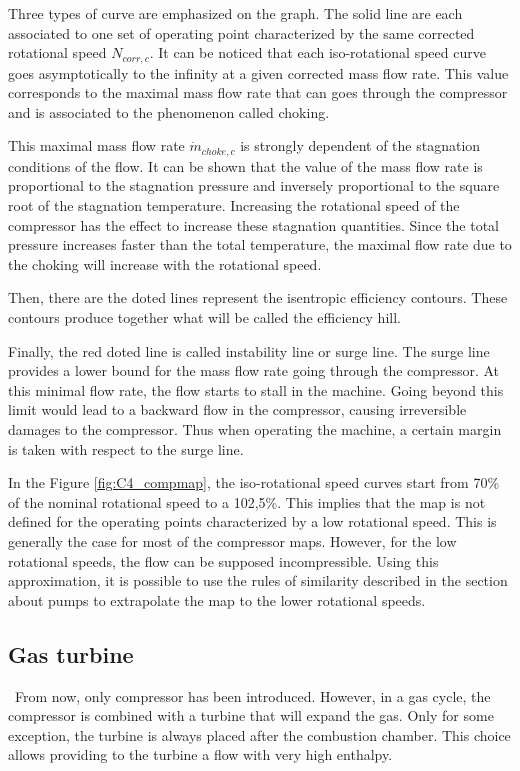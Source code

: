 Three types of curve are emphasized on the graph. The solid line are each associated to one set of operating point characterized by the same corrected rotational speed $N_{corr,c}$. It can be noticed that each iso-rotational speed curve goes asymptotically to the infinity at a given corrected mass flow rate. This value corresponds to the maximal mass flow rate that can goes through the compressor and is associated to the phenomenon called choking. 

This maximal mass flow rate $\dot{m}_{choke,c}$ is strongly dependent of the stagnation conditions of the flow. It can be shown that the value of the mass flow rate is proportional to the stagnation pressure and inversely proportional to the square root of the stagnation temperature.
Increasing the rotational speed of the compressor has the effect to increase these stagnation quantities. Since the total pressure increases faster than the total temperature, the maximal flow rate due to the choking will increase with the rotational speed.

Then, there are the doted lines represent the isentropic efficiency contours. These contours produce together what will be called the efficiency hill.

Finally, the red doted line is called instability line or surge line. The surge line provides a lower bound for the mass flow rate going through the compressor. At this minimal flow rate, the flow starts to stall in the machine. Going beyond this limit would lead to a backward flow in the compressor, causing irreversible damages to the compressor. Thus when operating the machine, a certain margin is taken with respect to the surge line.

In the Figure \ref{fig:C4_compmap},  the iso-rotational speed curves start from 70\% of the nominal rotational speed to a 102,5\%. This implies that the map is not defined for the operating points characterized by a low rotational speed. This is generally the case for most of the compressor maps. However, for the low rotational speeds, the flow can be supposed incompressible. Using this approximation, it is possible to use the rules of similarity described in the section about pumps to extrapolate the map to the lower rotational speeds.

\subsection{Gas turbine}
\quad\ From now, only compressor has been introduced. However, in a gas cycle, the compressor is combined with a turbine that will expand the gas. Only for some exception, the turbine is always placed after the combustion chamber. This choice allows providing to the turbine a flow with very high enthalpy.

